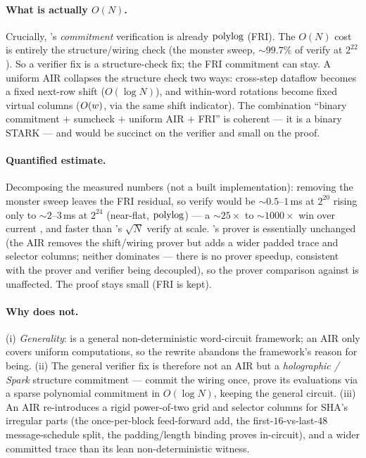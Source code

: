 \paragraph{What is actually $O(N)$.} Crucially, \binius{}'s
\emph{commitment} verification is already $\operatorname{polylog}$ (FRI). The $O(N)$
cost is entirely the structure/wiring check (the monster sweep,
$\sim$$99.7\%$ of verify at $2^{22}$). So a verifier fix is a
structure-check fix; the FRI commitment can stay. A uniform AIR collapses
the structure check two ways: cross-step dataflow becomes a fixed
next-row shift ($O(\log N)$), and within-word rotations become fixed
virtual columns ($O(w)$, via the same shift indicator). The
combination ``binary commitment $+$ sumcheck $+$ uniform AIR $+$ FRI'' is
coherent --- it is a binary STARK --- and would be succinct on the
verifier and small on the proof.

\paragraph{Quantified estimate.} Decomposing the measured numbers (not a
built implementation): removing the monster sweep leaves the FRI residual,
so verify would be $\sim$$0.5$--$1$\,ms at $2^{20}$ rising only to
$\sim$$2$--$3$\,ms at $2^{24}$ (near-flat, $\operatorname{polylog}$) --- a $\sim$$25\times$
to $\sim$$1000\times$ win over current \binius{}, and faster than \zinc{}'s
$\sqrt N$ verify at scale. \binius{}'s prover is essentially unchanged (the
AIR removes the shift/wiring prover but adds a wider padded trace and
selector columns; neither dominates --- there is no prover speedup,
consistent with the prover and verifier being decoupled), so the
prover comparison against \zinc{} is unaffected. The proof stays small
(FRI is kept).

\paragraph{Why \binius{} does not.} (i) \emph{Generality}: \binius{} is a
general non-deterministic word-circuit framework; an AIR only covers
uniform computations, so the rewrite abandons the framework's reason for
being. (ii) The general verifier fix is therefore not an AIR but a
\emph{holographic / Spark} structure commitment \cite{spartan,lasso} ---
commit the wiring once, prove its evaluations via a sparse polynomial
commitment in $O(\log N)$, keeping the general circuit. (iii) An AIR
re-introduces a rigid power-of-two grid and selector columns for SHA's
irregular parts (the once-per-block feed-forward add, the
first-$16$-vs-last-$48$ message-schedule split, the padding/length
binding \binius{} proves in-circuit), and a wider committed trace than its
lean non-deterministic witness.

